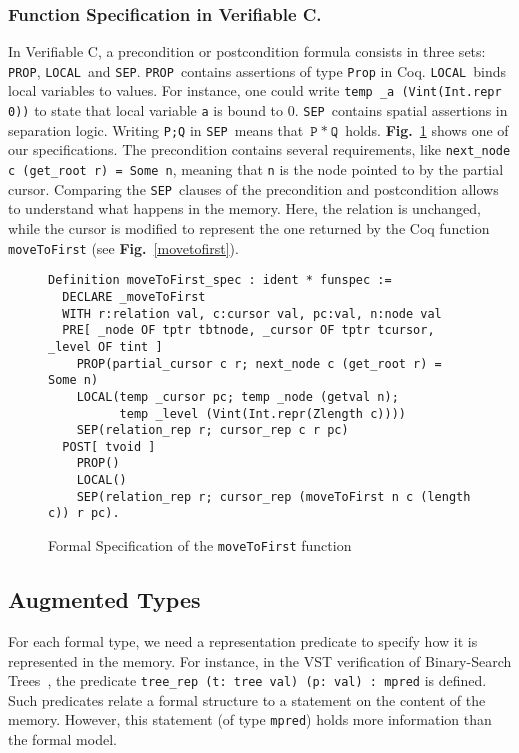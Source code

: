 \def\prop{\lstinline[language=Coq]{PROP}}
\def\local{\lstinline[language=Coq]{LOCAL}}
\def\sep{\lstinline[language=Coq]{SEP}}

\subsubsection{Function Specification in Verifiable C.}
In Verifiable C, a precondition or postcondition formula consists in three sets: \prop, \local\ and \sep.
\prop\ contains assertions of type \texttt{Prop} in Coq.
\local\ binds local variables to values. For instance, one could write \texttt{temp \_a (Vint(Int.repr 0))} to state that local variable \texttt{a} is bound to 0.
\sep\ contains spatial assertions in separation logic. Writing \texttt{P;Q} in \sep\ means that $\texttt{P}~*~\texttt{Q}$ holds.
\textbf{Fig.}~\ref{spec} shows one of our specifications.
The precondition contains several requirements, like \texttt{next\_node c (get\_root r) = Some n}, meaning that \texttt{n} is the node pointed to by the partial cursor.
Comparing the \sep\ clauses of the precondition and postcondition allows to understand what happens in the memory.
Here, the relation is unchanged, while the cursor is modified to represent the one returned by the Coq function \texttt{moveToFirst} (see \textbf{Fig.}~\ref{movetofirst}).

\begin{figure}
\begin{lstlisting}[language=Coq]
Definition moveToFirst_spec : ident * funspec :=
  DECLARE _moveToFirst
  WITH r:relation val, c:cursor val, pc:val, n:node val
  PRE[ _node OF tptr tbtnode, _cursor OF tptr tcursor, _level OF tint ]
    PROP(partial_cursor c r; next_node c (get_root r) = Some n)
    LOCAL(temp _cursor pc; temp _node (getval n);
          temp _level (Vint(Int.repr(Zlength c))))
    SEP(relation_rep r; cursor_rep c r pc)
  POST[ tvoid ]
    PROP()
    LOCAL()
    SEP(relation_rep r; cursor_rep (moveToFirst n c (length c)) r pc).
\end{lstlisting}
\caption{Formal Specification of the \texttt{moveToFirst} function}
\label{spec}
\end{figure}


\subsection{Augmented Types}
\label{subsec:rep}
For each formal type, we need a representation predicate to specify how it is represented in the memory.
For instance, in the VST verification of Binary-Search Trees~\cite{vst}, the predicate \lstinline[language=Coq]{tree_rep (t: tree val) (p: val) : mpred} is defined.
Such predicates relate a formal structure to a statement on the content of the memory.
However, this statement (of type \texttt{mpred}) holds more information than the formal model.

